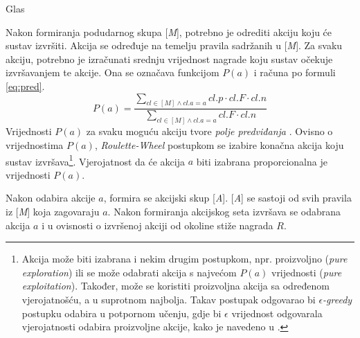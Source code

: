\documentclass[times, utf8, zavrsni]{fer}
\begin{document}
\begin{algorithm}
\caption{Glas}
\label{vote}
\begin{algorithmic}
\ENDIF
{}
\end{algorithmic}
\end{algorithm}

Nakon formiranja podudarnog skupa [\emph{M}], potrebno je odrediti akciju koju će sustav izvršiti.
Akcija se određuje na temelju pravila sadržanih u [\emph{M}].
Za svaku akciju, potrebno je izračunati srednju vrijednost nagrade koju sustav očekuje izvršavanjem te akcije.
Ona se označava funkcijom $P(a)$ i računa po formuli \eqref{eq:pred}.
\begin{equation}
\label{eq:pred}
P(a) = \frac{\sum_{cl \in [M] \land cl.a = a} cl.p \cdot cl.F \cdot cl.n}{\sum_{cl \in [M] \land cl.a = a} cl.F \cdot cl.n}
\end{equation}
Vrijednosti $P(a)$ za svaku moguću akciju tvore \emph{polje predviđanja} .
Ovisno o vrijednostima $P(a)$, \emph{Roulette-Wheel} postupkom se izabire konačna akcija koju sustav izvršava\footnote{
Akcija može biti izabrana i nekim drugim postupkom, npr. proizvoljno (\emph{pure exploration}) ili se može odabrati akcija s najvećom $P(a)$ vrijednosti (\emph{pure exploitation}).
Također, može se koristiti proizvoljna akcija sa određenom vjerojatnošću, a u suprotnom najbolja.
Takav postupak odgovarao bi \emph{$\epsilon$-greedy} postupku odabira u potpornom učenju, gdje bi $\epsilon$ vrijednost odgovarala vjerojatnosti odabira proizvoljne akcije, kako je navedeno u \citep{1}.}.
Vjerojatnost da će akcija $a$ biti izabrana proporcionalna je vrijednosti $P(a)$.

Nakon odabira akcije $a$, formira se akcijski skup  [\emph{A}].
[\emph{A}] se sastoji od svih pravila iz [\emph{M}] koja zagovaraju $a$.
Nakon formiranja akcijskog seta izvršava se odabrana akcija $a$ i u ovisnosti o izvršenoj akciji od okoline stiže nagrada $R$.
\end{document}
